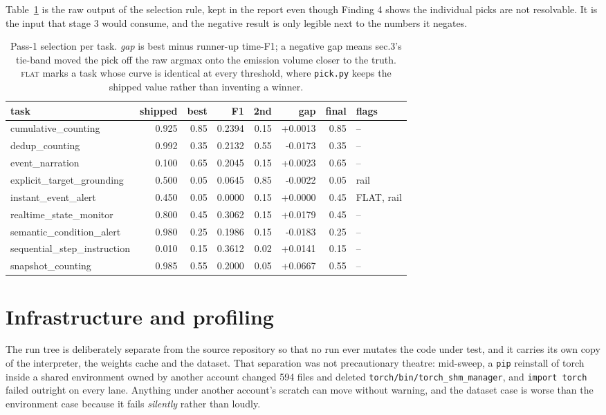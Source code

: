 \documentclass[11pt,a4paper]{article}
\begin{document}
Table~\ref{tab:picks} is the raw output of the selection rule, kept in
the report even though Finding 4 shows the individual picks are not resolvable.
It is the input that stage 3 would consume, and the negative result is only
legible next to the numbers it negates.

\begin{table}[t]\centering\small\caption{Pass-1 selection per task. \emph{gap} is best minus runner-up time-F1; a negative gap means sec.3's tie-band moved the pick off the raw argmax onto the emission volume closer to the truth. \textsc{flat} marks a task whose curve is identical at every threshold, where \texttt{pick.py} keeps the shipped value rather than inventing a winner.}\label{tab:picks}
\begin{tabular}{lrrrrrrl}\toprule
task & shipped & best & F1 & 2nd & gap & final & flags \\\midrule
cumulative\_counting & 0.925 & 0.85 & 0.2394 & 0.15 & +0.0013 & 0.85 & -- \\
dedup\_counting & 0.992 & 0.35 & 0.2132 & 0.55 & -0.0173 & 0.35 & -- \\
event\_narration & 0.100 & 0.65 & 0.2045 & 0.15 & +0.0023 & 0.65 & -- \\
explicit\_target\_grounding & 0.500 & 0.05 & 0.0645 & 0.85 & -0.0022 & 0.05 & rail \\
instant\_event\_alert & 0.450 & 0.05 & 0.0000 & 0.15 & +0.0000 & 0.45 & FLAT, rail \\
realtime\_state\_monitor & 0.800 & 0.45 & 0.3062 & 0.15 & +0.0179 & 0.45 & -- \\
semantic\_condition\_alert & 0.980 & 0.25 & 0.1986 & 0.15 & -0.0183 & 0.25 & -- \\
sequential\_step\_instruction & 0.010 & 0.15 & 0.3612 & 0.02 & +0.0141 & 0.15 & -- \\
snapshot\_counting & 0.985 & 0.55 & 0.2000 & 0.05 & +0.0667 & 0.55 & -- \\
\bottomrule\end{tabular}\end{table}


\section{Infrastructure and profiling}

The run tree is deliberately separate from the source repository so that
no run ever mutates the code under test, and it carries its own copy of the
interpreter, the weights cache and the dataset. That separation was not
precautionary theatre: mid-sweep, a \texttt{pip} reinstall of torch inside a
shared environment owned by another account changed 594 files and deleted
\texttt{torch/bin/torch\_shm\_manager}, and \texttt{import torch} failed outright
on every lane. Anything under another account's scratch can move without warning,
and the dataset case is worse than the environment case because it fails
\emph{silently} rather than loudly.
\end{document}
